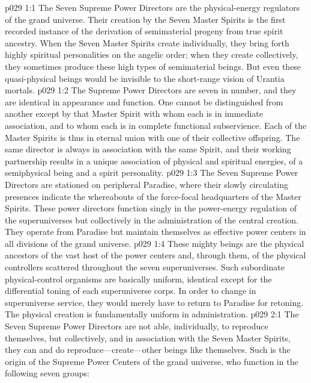 \vs p029 1:1 The Seven Supreme Power Directors are the physical\hyp{}energy regulators of the grand universe. Their creation by the Seven Master Spirits is the first recorded instance of the derivation of semimaterial progeny from true spirit ancestry. When the Seven Master Spirits create individually, they bring forth highly spiritual personalities on the angelic order; when they create collectively, they sometimes produce these high types of semimaterial beings. But even these quasi\hyp{}physical beings would be invisible to the short\hyp{}range vision of Urantia mortals.
\vs p029 1:2 The Supreme Power Directors are seven in number, and they are identical in appearance and function. One cannot be distinguished from another except by that Master Spirit with whom each is in immediate association, and to whom each is in complete functional subservience. Each of the Master Spirits is thus in eternal union with one of their collective offspring. The same director is always in association with the same Spirit, and their working partnership results in a unique association of physical and spiritual energies, of a semiphysical being and a spirit personality.
\vs p029 1:3 The Seven Supreme Power Directors are stationed on peripheral Paradise, where their slowly circulating presences indicate the whereabouts of the force\hyp{}focal headquarters of the Master Spirits. These power directors function singly in the power\hyp{}energy regulation of the superuniverses but collectively in the administration of the central creation. They operate from Paradise but maintain themselves as effective power centers in all divisions of the grand universe.
\vs p029 1:4 These mighty beings are the physical ancestors of the vast host of the power centers and, through them, of the physical controllers scattered throughout the seven superuniverses. Such subordinate physical\hyp{}control organisms are basically uniform, identical except for the differential toning of each superuniverse corps. In order to change in superuniverse service, they would merely have to return to Paradise for retoning. The physical creation is fundamentally uniform in administration.\plusone
{}
\vs p029 2:1 The Seven Supreme Power Directors are not able, individually, to reproduce themselves, but collectively, and in association with the Seven Master Spirits, they can and do reproduce---create---other beings like themselves. Such is the origin of the Supreme Power Centers of the grand universe, who function in the following seven groups:
